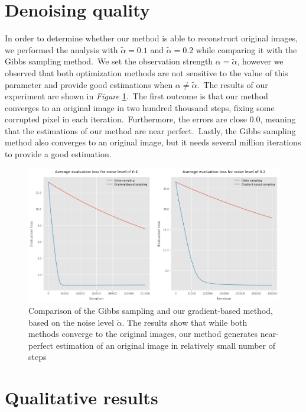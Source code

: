 \documentclass[shortabstract, english, lic]{iithesis}
\theoremstyle{default_theorem_style}\newtheorem{theorem}{Theorem}
\theoremstyle{default_theorem_style}\newtheorem{definition}{Definition}
\begin{document}
\section{Denoising quality}

In order to determine whether our method is able to reconstruct original images, we performed the analysis with
$\tilde{\alpha} = 0.1$ and $\tilde{\alpha} = 0.2$ while comparing it with the Gibbs sampling method.\ We set
the observation strength $\alpha = \tilde{\alpha}$, however we observed that both optimization methods are not
sensitive to the value of this parameter and provide good estimations when $\alpha \neq \tilde{\alpha}$.\ The
results of our experiment are shown in \textit{Figure} \ref{fig:grayscale_noise_level_plots}.\ The first outcome
is that our method converges to an original image in two hundred thousand steps, fixing some corrupted pixel in each
iteration.\ Furthermore, the errors are close $0.0$, meaning that the estimations of our method are near
perfect.\ Lastly, the Gibbs sampling method also converges to an original image, but it needs several million
iterations to provide a good estimation.\newline

\begin{figure}[H]
\centering
\includegraphics[scale=0.36]{grayscale_noise_level_plots}
\caption{Comparison of the Gibbs sampling and our gradient-based method, based on the noise level
$\tilde{\alpha}$. The results show that while both methods converge to the original images, our method generates
near-perfect estimation of an original image in relatively small number of steps}
\label{fig:grayscale_noise_level_plots}
\end{figure}

\section{Qualitative results}
\end{document}

